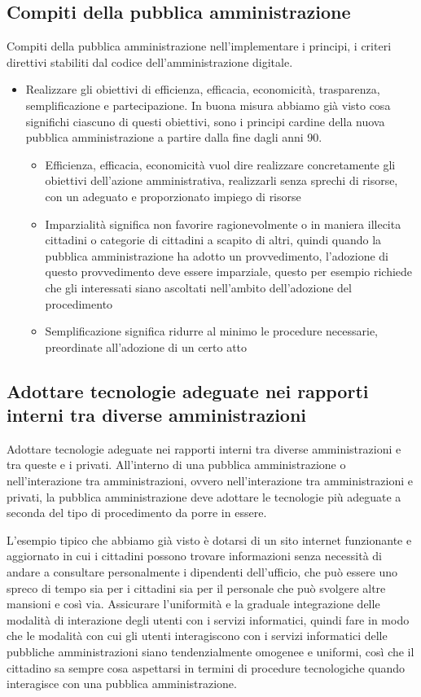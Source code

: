 \subsection{Compiti della pubblica amministrazione}
Compiti della pubblica amministrazione nell'implementare i principi, i criteri direttivi stabiliti dal codice dell'amministrazione digitale. 

\begin{itemize}
    \item Realizzare gli obiettivi di efficienza, efficacia, economicità, trasparenza, semplificazione e partecipazione. In buona misura abbiamo già visto cosa significhi ciascuno di questi obiettivi, sono i principi cardine della nuova pubblica amministrazione a partire dalla fine dagli anni 90. 
    \begin{itemize}
        \item Efficienza, efficacia, economicità vuol dire realizzare concretamente gli obiettivi dell'azione amministrativa, realizzarli senza sprechi di risorse, con un adeguato e proporzionato impiego di risorse
        \item Imparzialità significa non favorire ragionevolmente o in maniera illecita cittadini o categorie di cittadini a scapito di altri, quindi quando la pubblica amministrazione ha adotto un provvedimento, l'adozione di questo provvedimento deve essere imparziale, questo per esempio richiede che gli interessati siano ascoltati nell'ambito dell'adozione del procedimento
        \item  Semplificazione significa ridurre al minimo le procedure necessarie, preordinate all'adozione di un certo atto
    \end{itemize}
\end{itemize}


\subsection{Adottare tecnologie adeguate nei rapporti interni tra diverse amministrazioni}

Adottare tecnologie adeguate nei rapporti interni tra diverse amministrazioni e tra queste e i privati. All'interno di una pubblica amministrazione o nell'interazione tra amministrazioni, ovvero nell'interazione tra amministrazioni e privati, la pubblica amministrazione deve adottare le tecnologie più adeguate a seconda del tipo di procedimento da porre in essere. 

L'esempio tipico che abbiamo già visto è dotarsi di un sito internet funzionante e aggiornato in cui i cittadini possono trovare informazioni senza necessità di andare a consultare personalmente i dipendenti dell'ufficio, che può essere uno spreco di tempo sia per i cittadini sia per il personale che può svolgere altre mansioni e così via. 
Assicurare l'uniformità e la graduale integrazione delle modalità di interazione degli utenti con i servizi informatici, quindi fare in modo che le modalità con cui gli utenti interagiscono con i servizi informatici delle pubbliche amministrazioni siano tendenzialmente omogenee e uniformi, così che il cittadino sa sempre cosa aspettarsi in termini di procedure tecnologiche quando interagisce con una pubblica amministrazione. 

